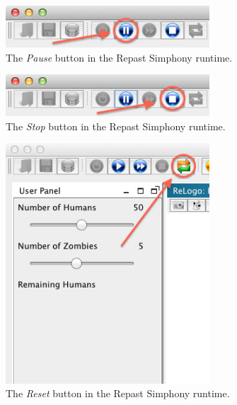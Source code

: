 \documentclass[11pt]{amsart}
\begin{document}
\begin{figure}
\begin{center}
\vspace{.2in}
\centerline {
\includegraphics[width=3in]{GettingStartedImages/PauseRuntime.png}
}
\caption{The \emph{Pause} button in the Repast Simphony runtime.}
\label{fig:pauseRuntime}
\end{center}
\end{figure}

\begin{figure}
\begin{center}
\vspace{.2in}
\centerline {
\includegraphics[width=3in]{GettingStartedImages/StopRuntime.png}
}
\caption{The \emph{Stop} button in the Repast Simphony runtime.}
\label{fig:stopRuntime}
\end{center}
\end{figure}

\begin{figure}
\begin{center}
\vspace{.2in}
\centerline {
\includegraphics[width=3in]{GettingStartedImages/ResetRuntime.png}
}
\caption{The \emph{Reset} button in the Repast Simphony runtime.}
\label{fig:resetRuntime}
\end{center}
\end{figure}
\end{document}

